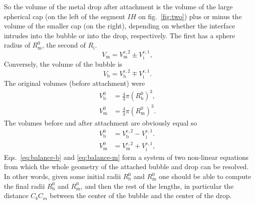 \documentclass{article}
\begin{document}
So the volume of the metal drop after attachment is the volume of the large
spherical cap (on the left of the segment $IH$ on fig.~\ref{fig:two}) plus or minus the
volume of the smaller cap (on the right), depending on whether the interface intrudes 
into the bubble or into the drop, respectively. The first has a sphere radius of
$R^0_\text{m}$, the second of $R_\text{i}$.
\begin{equation}
    V_\text{m} = V^{\text{c},2}_\text{m} \pm V^{\text{c},1}_\text{i},
    \label{eq:Vm}
\end{equation}
Conversely, the volume of the bubble is
\begin{equation}
    V_\text{b} = V^{\text{c},2}_\text{b} \mp V^{\text{c},1}_\text{i}.
    \label{eq:vb}
\end{equation}
The original volumes (before attachment) were
\begin{align}
    V^0_\text{b} &= \frac{4}{3}\pi \left(R^0_\text{b}\right)^3
    ,
    \\
    V^0_\text{m} &= \frac{4}{3}\pi \left(R^0_\text{m}\right)^3
    .
    \label{eq:V0}
\end{align}
The volumes before and after attachment are obviously equal so
\begin{align}
    V^0_\text{b} &= V^{\text{c},2}_\text{b} - V^{\text{c},1}_\text{i}.
   \label{eq:balance-b}
   \\
    V^0_\text{m} &= V^{\text{c},2}_\text{m} + V^{\text{c},1}_\text{i},
   \label{eq:balance-m}
\end{align}
Eqs.~\ref{eq:balance-b} and \ref{eq:balance-m} form a system of two non-linear
equations from which the whole geometry of the attached bubble and drop can be 
resolved. In other words, given some initial radii $R^0_\text{b}$ and
$R^0_\text{m}$ one should be able to compute the final radii $R^0_\text{b}$ and
$R^0_\text{m}$, and then the rest of the lengths, in particular the distance 
$C_bC_m$ between the center of the bubble and the center of the drop.
\end{document}
